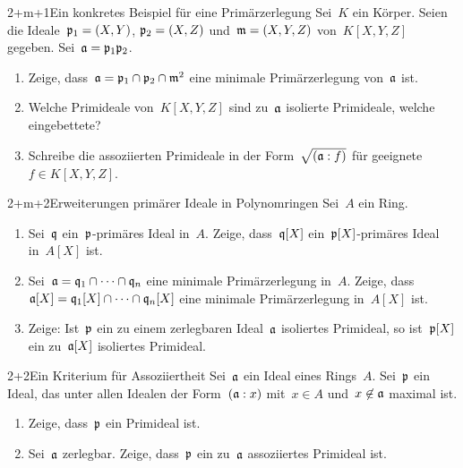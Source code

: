 \documentclass[entwurf]{uebblatt}
\begin{document}

\begin{aufgabe}{2+m+1}{Ein konkretes Beispiel für eine Primärzerlegung}
Sei~$K$ ein Körper. Seien die Ideale~$\mathfrak{p}_1 = (X,Y)$, $\mathfrak{p}_2 = (X,Z)$
und~$\mathfrak{m} = (X,Y,Z)$ von~$K[X,Y,Z]$ gegeben. Sei~$\mathfrak{a} = \mathfrak{p}_1 \mathfrak{p}_2$.
\begin{enumerate}
\item Zeige, dass~$\mathfrak{a} = \mathfrak{p}_1 \cap \mathfrak{p}_2 \cap \mathfrak{m}^2$ eine minimale
Primärzerlegung von~$\mathfrak{a}$ ist.
\item Welche Primideale von~$K[X,Y,Z]$ sind zu~$\mathfrak{a}$
isolierte Primideale, welche eingebettete?
\item Schreibe die assoziierten Primideale in der Form~$\sqrt{(\mathfrak{a}:f)}$ für
geeignete~$f \in K[X,Y,Z]$.
\end{enumerate}
\end{aufgabe}

\begin{aufgabe}{2+m+2}{Erweiterungen primärer Ideale in Polynomringen}
Sei~$A$ ein Ring.
\begin{enumerate}
\item Sei~$\mathfrak{q}$ ein~$\mathfrak{p}$-primäres Ideal
in~$A$. Zeige, dass~$\mathfrak{q}[X]$ ein~$\mathfrak{p}[X]$-primäres Ideal in~$A[X]$ ist.
\item Sei~$\mathfrak{a} = \mathfrak{q}_1 \cap \cdots \cap \mathfrak{q}_n$ eine minimale Primärzerlegung
in~$A$. Zeige, dass~$\mathfrak{a}[X] = \mathfrak{q}_1[X] \cap \cdots \cap \mathfrak{q}_n[X]$ eine
minimale Primärzerlegung in~$A[X]$ ist.
\item Zeige: Ist~$\mathfrak{p}$ ein zu einem zerlegbaren Ideal~$\mathfrak{a}$ isoliertes Primideal, so
ist~$\mathfrak{p}[X]$ ein zu~$\mathfrak{a}[X]$ isoliertes Primideal.
\end{enumerate}
\end{aufgabe}

\begin{aufgabe}{2+2}{Ein Kriterium für Assoziiertheit}
Sei~$\mathfrak{a}$ ein Ideal eines Rings~$A$.
Sei~$\mathfrak{p}$ ein Ideal, das unter allen Idealen der Form~$(\mathfrak{a}:x)$ mit~$x
\in A$ und~$x \not\in \mathfrak{a}$ maximal ist.
\begin{enumerate}
\item Zeige, dass~$\mathfrak{p}$ ein Primideal ist.
\item Sei~$\mathfrak{a}$ zerlegbar. Zeige, dass~$\mathfrak{p}$ ein zu~$\mathfrak{a}$ assoziiertes
Primideal ist.
\end{enumerate}
\end{aufgabe}
\end{document}
